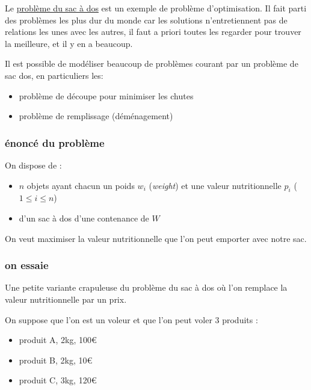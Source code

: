 \documentclass[
]{article}
\providecommand{\tightlist}{%
  \setlength{\itemsep}{0pt}\setlength{\parskip}{0pt}}
\begin{document}
Le
\href{https://fr.wikipedia.org/wiki/Probl\%C3\%A8me_du_sac_\%C3\%A0_dos}{problème
du sac à dos} est un exemple de problème d'optimisation. Il fait parti
des problèmes les plus dur du monde car les solutions n'entretiennent
pas de relations les unes avec les autres, il faut a priori toutes les
regarder pour trouver la meilleure, et il y en a beaucoup.

Il est possible de modéliser beaucoup de problèmes courant par un
problème de sac dos, en particuliers les:

\begin{itemize}
\tightlist
\item
  problème de découpe pour minimiser les chutes
\item
  problème de remplissage (déménagement)
\end{itemize}

\hypertarget{uxe9noncuxe9-du-probluxe8me}{%
\subsubsection{énoncé du problème}\label{uxe9noncuxe9-du-probluxe8me}}

On dispose de :

\begin{itemize}
\tightlist
\item
  \(n\) objets ayant chacun un poids \(w_i\) (\emph{weight}) et une
  valeur nutritionnelle \(p_i\) (\(1 \leq i \leq n\))
\item
  d'un sac à dos d'une contenance de \(W\)
\end{itemize}

On veut maximiser la valeur nutritionnelle que l'on peut emporter avec
notre sac.

\hypertarget{on-essaie}{%
\subsubsection{on essaie}\label{on-essaie}}

Une petite variante crapuleuse du problème du sac à dos où l'on remplace
la valeur nutritionnelle par un prix.

On suppose que l'on est un voleur et que l'on peut voler 3 produits :

\begin{itemize}
\tightlist
\item
  produit A, 2kg, 100€
\item
  produit B, 2kg, 10€
\item
  produit C, 3kg, 120€
\end{itemize}
\end{document}
